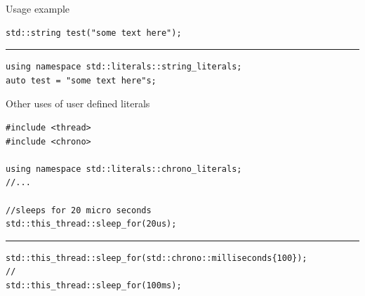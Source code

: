 \documentclass[10pt]{beamer}
\begin{document}
\begin{frame}[fragile]{Usage example}

	\begin{verbatim}
std::string test("some text here");
	\end{verbatim}

	\hrule
	\pause
	\begin{verbatim}
using namespace std::literals::string_literals;
auto test = "some text here"s;
	\end{verbatim}
\end{frame}

\begin{frame}[fragile]{Other uses of user defined literals}

	\begin{verbatim}
#include <thread>
#include <chrono>

using namespace std::literals::chrono_literals;
//...

//sleeps for 20 micro seconds
std::this_thread::sleep_for(20us); 
	\end{verbatim}
\pause
\hrule
\vfill
\begin{verbatim}
std::this_thread::sleep_for(std::chrono::milliseconds{100});
//
std::this_thread::sleep_for(100ms);
\end{verbatim}

\end{frame}
\end{document}
